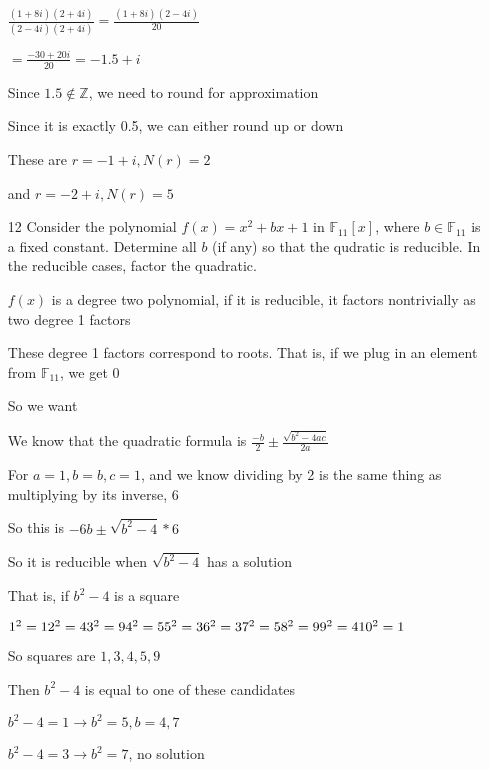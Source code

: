 \documentclass[12pt]{article}
\begin{document}
\begin{itemize}
		$\frac{(1+8i)(2+4i)}{(2-4i)(2+4i)} = \frac{(1+8i)(2-4i)}{20}$

		$=\frac{-30+20i}{20} = -1.5 + i$

		Since $1.5 \not \in \mathbb{Z}$, we need to round for approximation

		Since it is exactly 0.5, we can either round up or down

		These are $r = -1 + i, N(r) = 2$

		and $r = -2 + i, N(r) = 5$

	\item[12] Consider the polynomial $f(x) = x^2 + bx + 1$ in $\mathbb{F}_{11}[x]$, where $b\in \mathbb{F}_{11}$ is a fixed constant. Determine all $b$ (if any) so that the qudratic is reducible. In the reducible cases, factor the quadratic.

		$f(x)$ is a degree two polynomial, if it is reducible, it factors nontrivially as two degree 1 factors

		These degree 1 factors correspond to roots. That is, if we plug in an element from $\mathbb{F}_{11}$, we get 0

		So we want 

		We know that the quadratic formula is $\frac{-b}{2} \pm \frac{\sqrt{b^2 - 4ac}}{2a}$

		For $a = 1, b = b, c = 1$, and we know dividing by 2 is the same thing as multiplying by its inverse, 6

		So this is $-6b \pm \sqrt{b^2 - 4}*6$

		So it is reducible when $\sqrt{b^2 -4}$ has a solution

		That is, if $b^2 -4$ is a square

		$1^2 = 1\\
		2^2 = 4\\
		3^2 = 9\\
		4^2 = 5\\
		5^2 = 3\\
		6^2 = 3\\
		7^2 = 5\\
		8^2 = 9\\
		9^2 = 4\\
		10^2 = 1\\$

		So squares are $1, 3, 4, 5, 9$

		Then $b^2 - 4$ is equal to one of these candidates

		$b^2 - 4 = 1 \rightarrow b^2 = 5, b = 4,7$

		$b^2 - 4 = 3 \rightarrow b^2 = 7$, no solution


\end{itemize}
\end{document}
